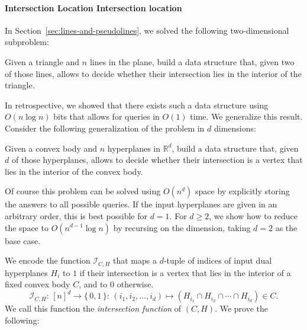 \paragraph*{\iftitlecase%
Intersection Location\else%
Intersection location\fi}

In Section~\ref{sec:lines-and-pseudolines}, we solved the following two-dimensional subproblem:

\begin{problem}
  Given a triangle and \(n\) lines in the plane, build a data structure that,
  given two of those lines, allows to decide whether their intersection
  lies in the interior of the triangle.
\end{problem}

In retrospective, we showed that there exists such a data structure using
\(O(n \log n)\) bits that allows for queries in \(O(1)\) time. We generalize
this result. Consider the following generalization of the problem in
\(d\) dimensions:

\begin{problem}
  Given a convex body and \(n\) hyperplanes in \(\mathbb{R}^d\), build a data
  structure that, given \(d\) of those hyperplanes, allows to decide whether their
  intersection is a vertex that lies in the interior of the convex body.
\end{problem}

Of course this problem can be solved using \(O(n^d)\) space by explicitly
storing the answers to all possible queries. If the input hyperplanes are
given in an arbitrary order, this is best possible for
\(d=1\). For \(d \geq 2\), we show how to reduce the space to \(O(n^{d-1} \log
n)\) by recursing on the dimension, taking \(d = 2\) as the base case.

We encode the function \(\mathcal{I}_{C, H}\)
that maps a \(d\)-tuple of indices of input dual
hyperplanes \(H_i\) to \(1\) if their intersection is a vertex that lies in the
interior of a fixed convex body \(C\), and to \(0\) otherwise.
%
\begin{displaymath}
  \mathcal{I}_{C,H} \colon\, {[n]}^d \to \{\, 0,1\,\} \colon\,
  (i_1,i_2,\ldots,i_d) \mapsto
  (H_{i_1} \cap H_{i_2} \cap \cdots \cap H_{i_d})
  \in  C.
\end{displaymath}
%
We call this function the \emph{intersection function} of \((C,H)\).
%
We prove the following:


